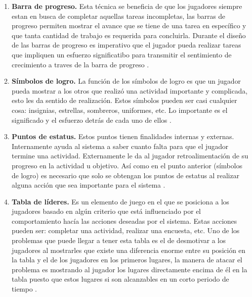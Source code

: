     \begin{enumerate} 
    \item
    {\bf Barra de progreso.} %
        Esta técnica se beneficia de que los jugadores siempre estan en busca de completar aquellas
        tareas incompletas, las barras de progreso permiten mostrar el avance que se tiene de una
        tarea en específico y que tanta cantidad de trabajo es requerida para concluirla. Durante el
        diseño de las barras de progreso es imperativo que el jugador pueda realizar tareas que
        impliquen un esfuerzo significatibo para transmitir el sentimiento de crecimiento a traves de
        la barra de progreso \cite[p. 113]{Octalysis}.
        
    \item
    {\bf Símbolos de logro.}
        La función de los símbolos de logro es que un jugador pueda mostrar a los otros
        que realizó una actividad importante y complicada, esto les da sentido de realización.
        Estos símbolos pueden ser casi cualquier cosa: insignias, estrellas, sombreros, uniformes,
        etc. Lo importante es el significado y el esfuerzo detrás de cada uno de ellos
        \cite[p. 117]{Octalysis}.
        
    \item
    {\bf Puntos de estatus.}
        Estos puntos tienen finalidades internas y externas. Internamente ayuda al sistema
        a saber cuanto falta para que el jugador termine una actividad. Externamente le da al
        jugador retroalimentación de su progreso en la actividad u objetivo. Así como en el
        punto anterior (símbolos de logro) es necesario que solo se obtengan los puntos de
        estatus al realizar alguna acción que sea importante para el sistema \cite[p. 118]{Octalysis}.
        
    \item
    {\bf Tabla de líderes.}
        Es un elemento de juego en el que se posiciona a los jugadores basado en algún criterio
        que está influenciado por el comportamiento hacía las acciones deseadas por el sistema.
        Estas acciones pueden ser: completar una actividad, realizar una encuesta, etc. Uno de
        los problemas que puede llegar a tener esta tabla es el de desmotivar a los jugadores
        al mostrarles que existe una diferencia enorme entre su posición en la tabla y el de los
        jugadores en los primeros lugares, la manera de atacar el problema es mostrando al jugador
        los lugares directamente encima de él en la tabla puesto que estos lugares si son
        alcanzables en un corto periodo de tiempo \cite[p. 121]{Octalysis}.
        
    \end{enumerate}
    
